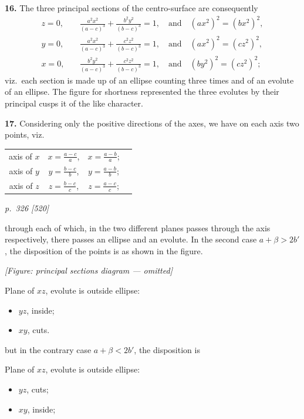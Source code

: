 \documentclass[11pt,a4paper]{book}
\begin{document}
\textbf{16.} The three principal sections of the centro-surface are consequently
\begin{align*}
z = 0,\quad &\frac{a^2 x^2}{(a - c)^3} + \frac{b^2 y^2}{(b - c)^3} = 1,\quad\text{and}\quad (a x^2)^2 = (b x^2)^2,\\
y = 0,\quad &\frac{a^2 x^2}{(a - c)^3} + \frac{c^2 z^2}{(b - c)^3} = 1,\quad\text{and}\quad (a x^2)^2 = (c z^2)^2,\\
x = 0,\quad &\frac{b^2 y^2}{(a - c)^3} + \frac{c^2 z^2}{(b - c)^3} = 1,\quad\text{and}\quad (b y^2)^2 = (c z^2)^2;
\end{align*}
viz.\ each section is made up of an ellipse counting three times and of an evolute of an ellipse. The figure for shortness represented the three evolutes by their principal cusps it of the like character.

\textbf{17.} Considering only the positive directions of the axes, we have on each axis two points, viz.\
\begin{center}
\begin{tabular}{cccc}
axis of $x$ & $x = \tfrac{a - c}{a}$, & $x = \tfrac{a - b}{a}$;\\
axis of $y$ & $y = \tfrac{b - c}{b}$, & $y = \tfrac{a - b}{b}$;\\
axis of $z$ & $z = \tfrac{b - c}{c}$, & $z = \tfrac{a - c}{c}$;
\end{tabular}
\end{center}

\clearpage

\bigskip
\textit{p.~326 [520]}
\smallskip

through each of which, in the two different planes passes through the axis respectively, there passes an ellipse and an evolute. In the second case $a + \beta > 2b'$, the disposition of the points is as shown in the figure.

\begin{center}
\textit{[Figure: principal sections diagram --- omitted]}
\end{center}

Plane of $xz$, evolute is outside ellipse:
\begin{itemize}[leftmargin=2em]
\item[] $yz$, inside;
\item[] $xy$, cuts.
\end{itemize}

but in the contrary case $a + \beta < 2b'$, the disposition is

Plane of $xz$, evolute is outside ellipse:
\begin{itemize}[leftmargin=2em]
\item[] $yz$, cuts;
\item[] $xy$, inside;
\end{itemize}
\end{document}
